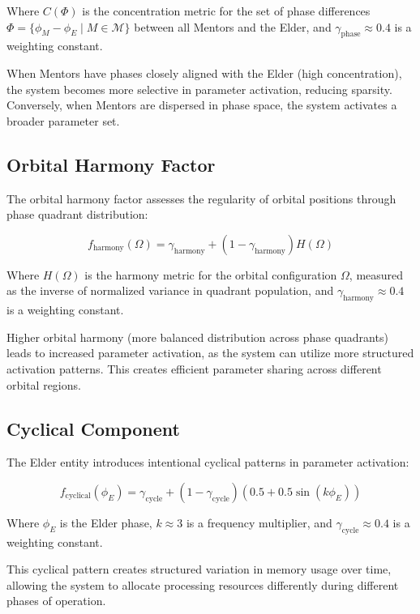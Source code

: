 Where $C(\Phi)$ is the concentration metric for the set of phase differences $\Phi = \{\phi_M - \phi_E \mid M \in \mathcal{M}\}$ between all Mentors and the Elder, and $\gamma_{\text{phase}} \approx 0.4$ is a weighting constant.

When Mentors have phases closely aligned with the Elder (high concentration), the system becomes more selective in parameter activation, reducing sparsity. Conversely, when Mentors are dispersed in phase space, the system activates a broader parameter set.

\subsection{Orbital Harmony Factor}

The orbital harmony factor assesses the regularity of orbital positions through phase quadrant distribution:

\begin{equation}
f_{\text{harmony}}(\Omega) = \gamma_{\text{harmony}} + (1 - \gamma_{\text{harmony}})H(\Omega)
\end{equation}

Where $H(\Omega)$ is the harmony metric for the orbital configuration $\Omega$, measured as the inverse of normalized variance in quadrant population, and $\gamma_{\text{harmony}} \approx 0.4$ is a weighting constant.

Higher orbital harmony (more balanced distribution across phase quadrants) leads to increased parameter activation, as the system can utilize more structured activation patterns. This creates efficient parameter sharing across different orbital regions.

\subsection{Cyclical Component}

The Elder entity introduces intentional cyclical patterns in parameter activation:

\begin{equation}
f_{\text{cyclical}}(\phi_E) = \gamma_{\text{cycle}} + (1 - \gamma_{\text{cycle}})(0.5 + 0.5\sin(k\phi_E))
\end{equation}

Where $\phi_E$ is the Elder phase, $k \approx 3$ is a frequency multiplier, and $\gamma_{\text{cycle}} \approx 0.4$ is a weighting constant.

This cyclical pattern creates structured variation in memory usage over time, allowing the system to allocate processing resources differently during different phases of operation.

